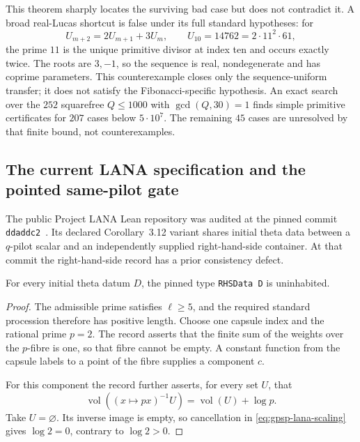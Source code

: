 This theorem sharply locates the surviving bad case but does not contradict
it.  A broad real-Lucas shortcut is false under its full standard
hypotheses: for
\[
 U_{m+2}=2U_{m+1}+3U_m,
 \qquad U_{10}=14762=2\cdot11^2\cdot61,
\]
the prime $11$ is the unique primitive divisor at index ten and occurs
exactly twice.  The roots are $3,-1$, so the sequence is real,
nondegenerate and has coprime parameters.  This counterexample closes only
the sequence-uniform transfer; it does not satisfy the Fibonacci-specific
hypothesis.  An exact search over the $252$ squarefree $Q\le1000$ with
$\gcd(Q,30)=1$ finds simple primitive certificates for $207$ cases below
$5\cdot10^7$.  The remaining $45$ cases are unresolved by that finite bound,
not counterexamples.

\subsection{The current LANA specification and the pointed same-pilot gate}

The public Project LANA Lean repository was audited at the pinned commit
\texttt{ddaddc2}~\cite{LANAlean}.
Its declared Corollary~3.12 variant shares initial theta data between a
$q$-pilot scalar and an independently supplied right-hand-side container.
At that commit the right-hand-side record has a prior consistency defect.

\begin{theorem}
\label{thm:gpsp-lana-empty}
For every initial theta datum $D$, the pinned type \texttt{RHSData D} is
uninhabited.
\end{theorem}

\begin{proof}
The admissible prime satisfies $\ell\geq5$, and the required standard
procession therefore has positive length.  Choose one capsule index and the
rational prime $p=2$.  The record asserts that the finite sum of the weights
over the $p$-fibre is one, so that fibre cannot be empty.  A constant function
from the capsule labels to a point of the fibre supplies a component $c$.

For this component the record further asserts, for every set $U$, that
\begin{equation}\label{eq:gpsp-lana-scaling}
 \operatorname{vol}((x\mapsto px)^{-1}U)
   =\operatorname{vol}(U)+\log p.
\end{equation}
Take $U=\varnothing$.  Its inverse image is empty, so cancellation in
\eqref{eq:gpsp-lana-scaling} gives $\log2=0$, contrary to $\log2>0$.
\end{proof}

